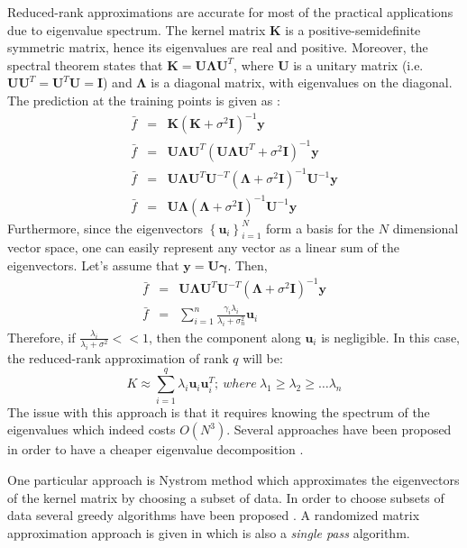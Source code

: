 \documentclass{article}
\begin{document}
Reduced-rank approximations are accurate for most of the practical applications due to eigenvalue spectrum. The kernel matrix $\mathbf{K}$ is a positive-semidefinite symmetric matrix, hence its eigenvalues are real and positive. Moreover, the spectral theorem states that $\mathbf{K}=\mathbf{U\Lambda U}^T$, where $\mathbf{U}$ is a unitary matrix (i.e. $\mathbf{U}\mathbf{U}^T=\mathbf{U}^T\mathbf{U}=\mathbf{I}$) and $\mathbf{\Lambda}$ is a diagonal matrix, with eigenvalues on the diagonal. The prediction at the training points is given as :
\begin{eqnarray}
\bar{f}&=&\mathbf{K}(\mathbf{K}+\sigma^2\mathbf{I})^{-1}\mathbf{y} \nonumber \\
\bar{f}&=&\mathbf{U\Lambda U}^T(\mathbf{U\Lambda U}^T+\sigma^2\mathbf{I})^{-1}\mathbf{y} \nonumber \\
\bar{f}&=& \mathbf{U\Lambda U}^T\mathbf{U}^{-T}(\mathbf{\Lambda}+\sigma^2\mathbf{I})^{-1}\mathbf{U}^{-1}\mathbf{y} \nonumber \\
\bar{f}&=& \mathbf{U\Lambda}(\mathbf{\Lambda}+\sigma^2\mathbf{I})^{-1}\mathbf{U}^{-1}\mathbf{y} 
\end{eqnarray}
Furthermore, since the eigenvectors $\left\{\mathbf{u}_i\right\}_{i=1}^N$ form a basis for the $N$ dimensional vector space, one can easily represent any vector as a linear sum of the eigenvectors. Let's assume that $\mathbf{y}=\mathbf{U}\mathbf{\gamma}$. Then,
\begin{eqnarray}
\bar{f}&=& \mathbf{U\Lambda U}^T\mathbf{U}^{-T}(\mathbf{\Lambda}+\sigma^2\mathbf{I})^{-1}\mathbf{y}  \nonumber \\
\bar{f}&=&\sum_{i=1}^n\frac{\gamma_i\lambda_i}{\lambda_i+\sigma_n^2}\mathbf{u}_i
\end{eqnarray}
Therefore, if $\frac{\lambda_i}{\lambda_i+\sigma^2}<<1$, then the component along $\mathbf{u}_i$ is negligible. In this case, the reduced-rank approximation of rank $q$ will be:
\begin{equation}
K\approx \sum_{i=1}^q \lambda_i \mathbf{u}_i \mathbf{u}_i^T; \> where \> \lambda_1\geq \lambda_2 \geq \dots \lambda_n
\end{equation}
The issue with this approach is that it requires knowing the spectrum of the eigenvalues which indeed costs $O(N^3)$.  Several approaches have been proposed in order to have a cheaper eigenvalue decomposition \cite{rasmussen06}. 

One particular approach is Nystrom method which approximates the eigenvectors of the kernel matrix by choosing a subset of data. In order to choose subsets of data several greedy algorithms have been proposed \cite{rasmussen} \cite{smolaGreedy}. A randomized matrix approximation approach is given in \cite{RandomizedMatrixDecompose} which is also a \textit{single pass} algorithm. 
\end{document}
